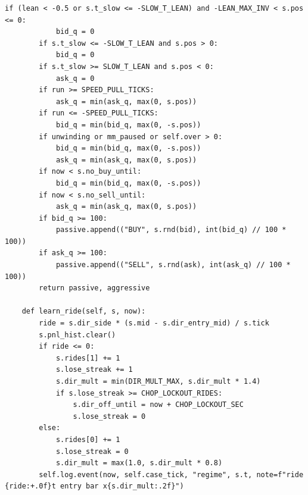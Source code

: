 \begin{lstlisting}[style=algocode]
        if (lean < -0.5 or s.t_slow <= -SLOW_T_LEAN) and -LEAN_MAX_INV < s.pos <= 0:
            bid_q = 0
        if s.t_slow <= -SLOW_T_LEAN and s.pos > 0:
            bid_q = 0
        if s.t_slow >= SLOW_T_LEAN and s.pos < 0:
            ask_q = 0
        if run >= SPEED_PULL_TICKS:
            ask_q = min(ask_q, max(0, s.pos))
        if run <= -SPEED_PULL_TICKS:
            bid_q = min(bid_q, max(0, -s.pos))
        if unwinding or mm_paused or self.over > 0:
            bid_q = min(bid_q, max(0, -s.pos))
            ask_q = min(ask_q, max(0, s.pos))
        if now < s.no_buy_until:
            bid_q = min(bid_q, max(0, -s.pos))
        if now < s.no_sell_until:
            ask_q = min(ask_q, max(0, s.pos))
        if bid_q >= 100:
            passive.append(("BUY", s.rnd(bid), int(bid_q) // 100 * 100))
        if ask_q >= 100:
            passive.append(("SELL", s.rnd(ask), int(ask_q) // 100 * 100))
        return passive, aggressive

    def learn_ride(self, s, now):
        ride = s.dir_side * (s.mid - s.dir_entry_mid) / s.tick
        s.pnl_hist.clear()
        if ride <= 0:
            s.rides[1] += 1
            s.lose_streak += 1
            s.dir_mult = min(DIR_MULT_MAX, s.dir_mult * 1.4)
            if s.lose_streak >= CHOP_LOCKOUT_RIDES:
                s.dir_off_until = now + CHOP_LOCKOUT_SEC
                s.lose_streak = 0
        else:
            s.rides[0] += 1
            s.lose_streak = 0
            s.dir_mult = max(1.0, s.dir_mult * 0.8)
        self.log.event(now, self.case_tick, "regime", s.t, note=f"ride {ride:+.0f}t entry bar x{s.dir_mult:.2f}")


\end{lstlisting}
